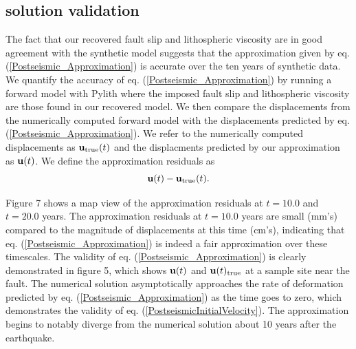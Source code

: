 \documentclass[12pt]{article}
\begin{document}

\subsection{solution validation}
The fact that our recovered fault slip and lithospheric viscosity are
in good agreement with the synthetic model suggests that the
approximation given by eq. (\ref{Postseismic_Approximation}) is
accurate over the ten years of synthetic data.  We quantify the
accuracy of eq. (\ref{Postseismic_Approximation}) by running a forward
model with Pylith where the imposed fault slip and lithospheric
viscosity are those found in our recovered model.  We then compare the
displacements from the numerically computed forward model with the
displacements predicted by eq. (\ref{Postseismic_Approximation}).  We
refer to the numerically computed displacements as
$\bold{u}_{\mathrm{true}}(t)$ and the displacments predicted by our
approximation as $\bold{u}(t)$.  We define the approximation residuals
as 
\begin{equation}
\bold{u}(t) - \bold{u}_{\mathrm{true}}(t).
\end{equation}

Figure 7 shows a map view of the approximation residuals at $t=10.0$
and $t=20.0$ years.  The approximation residuals at $t=10.0$ years are
small (mm's) compared to the magnitude of displacements at this time
(cm's), indicating that eq. (\ref{Postseismic_Approximation}) is
indeed a fair approximation over these timescales.  The validity of
eq. (\ref{Postseismic_Approximation}) is clearly demonstrated in
figure 5, which shows $\bold{u}(t)$ and $\bold{u}(t)_{\mathrm{true}}$
at a sample site near the fault.  The numerical solution
asymptotically approaches the rate of deformation predicted by
eq. (\ref{Postseismic_Approximation}) as the time goes to zero, which
demonstrates the validity of eq. (\ref{PostseismicInitialVelocity}).
The approximation begins to notably diverge from the numerical
solution about 10 years after the earthquake.
\end{document}
